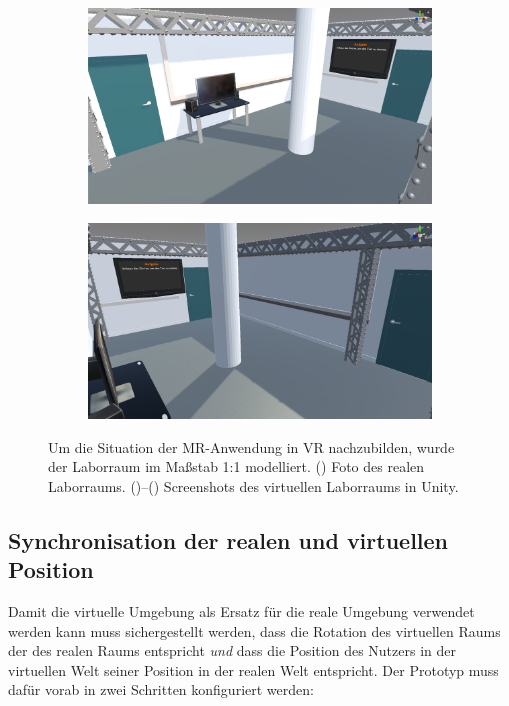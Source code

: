 \begin{figure}
    \vspace{1em}
    \begin{subfigure}{0.49\textwidth}
        \includegraphics[width=\textwidth]{figures/lab1}
        \caption{}
        \label{sfig:lab_screenshot_2}
    \end{subfigure}
    \hfill
    \begin{subfigure}{0.49\textwidth}
        \includegraphics[width=\textwidth]{figures/lab2}
        \caption{}
        \label{sfig:lab_screenshot_3}
    \end{subfigure}
    \caption{Um die Situation der MR-Anwendung in VR nachzubilden, wurde der Laborraum im Maßstab 1:1 modelliert. %
             () Foto des realen Laborraums. %
             ()--() Screenshots des virtuellen Laborraums in Unity.%
	}
	\label{fig:lab_environment}
\end{figure}

\subsection*{Synchronisation der realen und virtuellen Position}
Damit die virtuelle Umgebung als Ersatz für die reale Umgebung verwendet werden kann muss sichergestellt werden, dass die Rotation des virtuellen Raums der des realen Raums entspricht \emph{und} dass die Position des Nutzers in der virtuellen Welt seiner Position in der realen Welt entspricht.
Der Prototyp muss dafür vorab in zwei Schritten konfiguriert werden:

